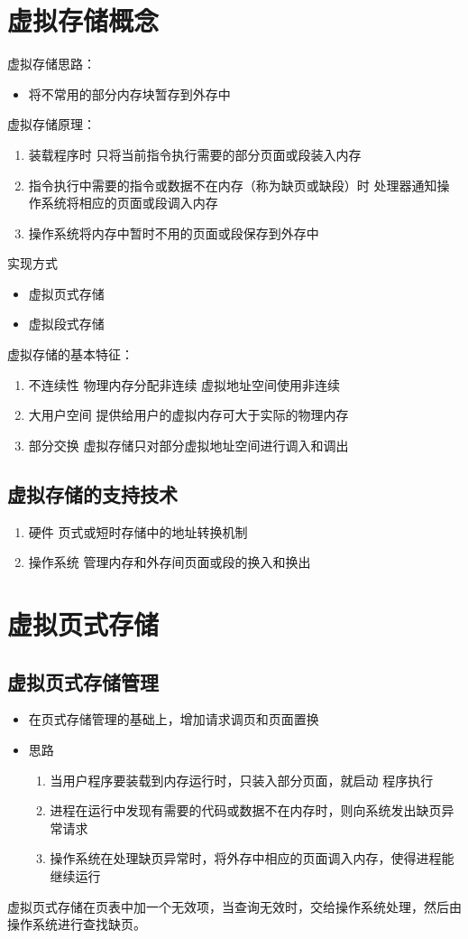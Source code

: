 \section{虚拟存储概念}
虚拟存储思路：
\begin{itemize}
	\item 将不常用的部分内存块暂存到外存中
\end{itemize}
虚拟存储原理：
\begin{enumerate}
	\item 装载程序时
	\subitem 只将当前指令执行需要的部分页面或段装入内存
	\item 指令执行中需要的指令或数据不在内存（称为缺页或缺段）时
	\subitem 处理器通知操作系统将相应的页面或段调入内存
	\item 操作系统将内存中暂时不用的页面或段保存到外存中
\end{enumerate}
实现方式
\begin{itemize}
	\item 虚拟页式存储
	\item 虚拟段式存储
\end{itemize}
虚拟存储的基本特征：
\begin{enumerate}
	\item 不连续性
	\subitem 物理内存分配非连续
	\subitem 虚拟地址空间使用非连续
	\item 大用户空间
	\subitem 提供给用户的虚拟内存可大于实际的物理内存
	\item 部分交换
	\subitem 虚拟存储只对部分虚拟地址空间进行调入和调出
\end{enumerate}
\subsection{虚拟存储的支持技术}
\begin{enumerate}
	\item 硬件
	\subitem 页式或短时存储中的地址转换机制
	\item 操作系统
	\subitem 管理内存和外存间页面或段的换入和换出
\end{enumerate}

\section{虚拟页式存储}
\subsection{虚拟页式存储管理}
\begin{itemize}
	\item 在页式存储管理的基础上，增加请求调页和页面置换
	\item 思路
	\begin{enumerate}
		\item 当用户程序要装载到内存运行时，只装入部分页面，就启动
		程序执行
		\item 进程在运行中发现有需要的代码或数据不在内存时，则向系统发出缺页异常请求
		\item 操作系统在处理缺页异常时，将外存中相应的页面调入内存，使得进程能继续运行
	\end{enumerate}
\end{itemize}
虚拟页式存储在页表中加一个无效项，当查询无效时，交给操作系统处理，然后由
操作系统进行查找缺页。

